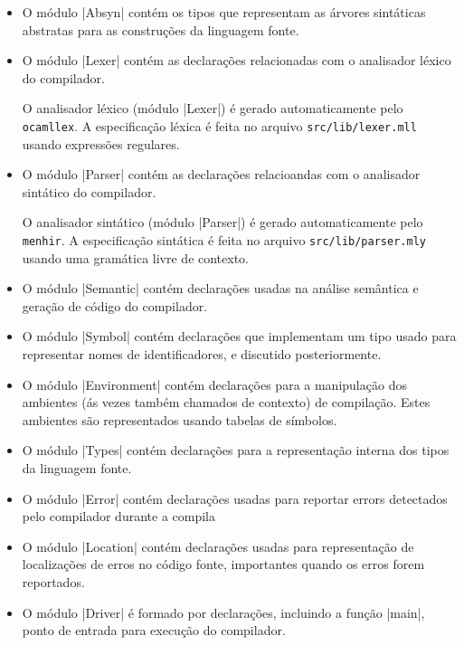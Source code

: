 \documentclass[a4paper,11pt,brazil]{article}
\begin{document}
\begin{itemize}
  \item O módulo \pyginline|Absyn| contém os tipos que representam as
  árvores sintáticas abstratas para as construções da linguagem fonte.

  \item O módulo \pyginline|Lexer| contém as declarações relacionadas
  com o analisador léxico do compilador.

  O analisador léxico (módulo \pyginline|Lexer|) é gerado
  automaticamente pelo \texttt{ocamllex}. A especificação léxica é
  feita no arquivo \texttt{src/lib/lexer.mll} usando expressões
  regulares.

  \item O módulo \pyginline|Parser| contém as declarações relacioandas
  com o analisador sintático do compilador.

  O analisador sintático (módulo \pyginline|Parser|) é gerado
  automaticamente pelo \texttt{menhir}. A especificação sintática é
  feita no arquivo \texttt{src/lib/parser.mly} usando uma gramática
  livre de contexto.
  
  \item O módulo \pyginline|Semantic| contém declarações usadas na
  análise semântica e geração de código do compilador.

  \item O módulo \pyginline|Symbol| contém declarações que implementam
  um tipo usado para representar nomes de identificadores, e
  discutido posteriormente.

  \item O módulo \pyginline|Environment| contém declarações para a
  manipulação dos ambientes (ás vezes também chamados de contexto) de
  compilação. Estes ambientes são representados usando tabelas de
  símbolos.

  \item O módulo \pyginline|Types| contém declarações para a
  representação interna dos tipos da linguagem fonte.

  \item O módulo \pyginline|Error| contém declarações usadas para
  reportar errors detectados pelo compilador durante a compila

  \item O módulo \pyginline|Location| contém declarações usadas para
  representação de localizações de erros no código fonte, importantes
  quando os erros forem reportados.

  \item O módulo \pyginline|Driver| é formado por declarações, incluindo
  a função \pyginline|main|, ponto de entrada para execução do
  compilador.
\end{itemize}
\end{document}
